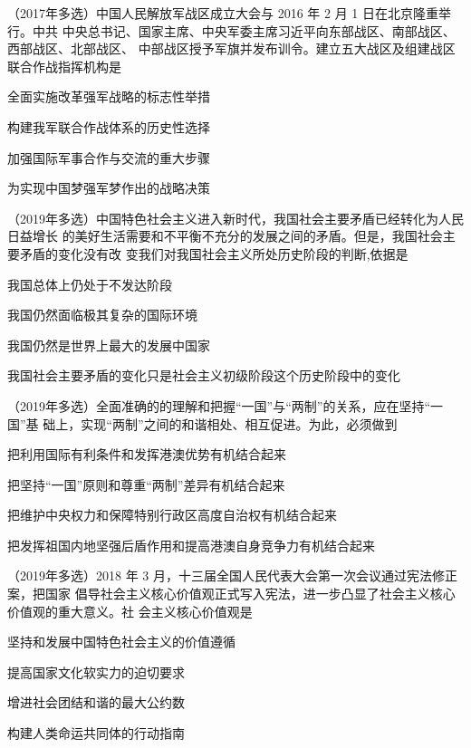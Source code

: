 \documentclass[lang=cn,blue,10pt,scheme=chinese,twocol]{zznote}
\begin{document}
\begin{example}	（2017年多选）中国人民解放军战区成立大会与 2016 年 2 月 1 日在北京隆重举行。中共
	中央总书记、国家主席、中央军委主席习近平向东部战区、南部战区、西部战区、北部战区、
	中部战区授予军旗并发布训令。建立五大战区及组建战区联合作战指挥机构是
	\begin{choice}
		\item 全面实施改革强军战略的标志性举措
		\item 构建我军联合作战体系的历史性选择
		\item 加强国际军事合作与交流的重大步骤
		\item 为实现中国梦强军梦作出的战略决策
	\end{choice}
\end{example}

\begin{example}	（2019年多选）中国特色社会主义进入新时代，我国社会主要矛盾已经转化为人民日益增长
	的美好生活需要和不平衡不充分的发展之间的矛盾。但是，我国社会主要矛盾的变化没有改
	变我们对我国社会主义所处历史阶段的判断,依据是
	\begin{choice}
		\item 我国总体上仍处于不发达阶段
		\item 我国仍然面临极其复杂的国际环境
		\item 我国仍然是世界上最大的发展中国家
		\item 我国社会主要矛盾的变化只是社会主义初级阶段这个历史阶段中的变化
	\end{choice}
\end{example}

\begin{example}	（2019年多选）全面准确的的理解和把握“一国”与“两制”的关系，应在坚持“一国”基
	础上，实现“两制”之间的和谐相处、相互促进。为此，必须做到
	\begin{choice}
		\item 把利用国际有利条件和发挥港澳优势有机结合起来
		\item 把坚持“一国”原则和尊重“两制”差异有机结合起来
		\item 把维护中央权力和保障特别行政区高度自治权有机结合起来
		\item 把发挥祖国内地坚强后盾作用和提高港澳自身竞争力有机结合起来
	\end{choice}
\end{example}


\begin{example}	（2019年多选）2018 年 3 月，十三届全国人民代表大会第一次会议通过宪法修正案，把国家
	倡导社会主义核心价值观正式写入宪法，进一步凸显了社会主义核心价值观的重大意义。社
	会主义核心价值观是
	\begin{choice}
		\item 坚持和发展中国特色社会主义的价值遵循
		\item 提高国家文化软实力的迫切要求
		\item 增进社会团结和谐的最大公约数
		\item 构建人类命运共同体的行动指南
	\end{choice}
\end{example}
\end{document}
